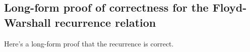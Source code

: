   






  


\subsection*{Long-form proof of correctness for the Floyd-Warshall recurrence relation}

Here's a long-form proof that the recurrence is correct.

